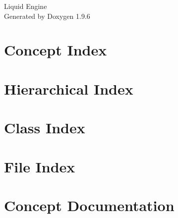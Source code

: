 \documentclass[twoside]{book}
\newcommand{\+}{\discretionary{\mbox{\scriptsize$\hookleftarrow$}}{}{}}
\newcommand{\clearemptydoublepage}{%
    \newpage{\pagestyle{empty}\cleardoublepage}%
  }
\begin{document}
  \raggedbottom
    \hypersetup{pageanchor=false,
                bookmarksnumbered=true,
                pdfencoding=unicode
               }
  \begin{titlepage}
  \vspace*{7cm}
  \begin{center}%
  {\Large Liquid Engine}\\
  \vspace*{1cm}
  {\large Generated by Doxygen 1.9.6}\\
  \end{center}
  \end{titlepage}
  \clearemptydoublepage
  \tableofcontents
  \clearemptydoublepage
  \hypersetup{pageanchor=true}
\chapter{Concept Index}

\chapter{Hierarchical Index}

\chapter{Class Index}

\chapter{File Index}

\chapter{Concept Documentation}

\end{document}
